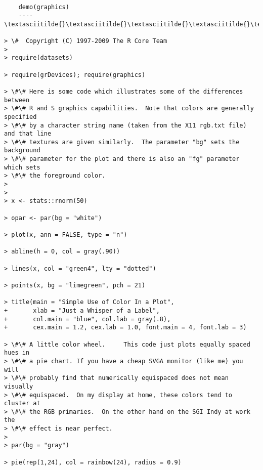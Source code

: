\documentclass[11pt]{article}
\begin{document}
    \begin{Verbatim}[commandchars=\\\{\}]


	demo(graphics)
	---- \textasciitilde{}\textasciitilde{}\textasciitilde{}\textasciitilde{}\textasciitilde{}\textasciitilde{}\textasciitilde{}\textasciitilde{}

> \#  Copyright (C) 1997-2009 The R Core Team
> 
> require(datasets)

> require(grDevices); require(graphics)

> \#\# Here is some code which illustrates some of the differences between
> \#\# R and S graphics capabilities.  Note that colors are generally specified
> \#\# by a character string name (taken from the X11 rgb.txt file) and that line
> \#\# textures are given similarly.  The parameter "bg" sets the background
> \#\# parameter for the plot and there is also an "fg" parameter which sets
> \#\# the foreground color.
> 
> 
> x <- stats::rnorm(50)

> opar <- par(bg = "white")

> plot(x, ann = FALSE, type = "n")

> abline(h = 0, col = gray(.90))

> lines(x, col = "green4", lty = "dotted")

> points(x, bg = "limegreen", pch = 21)

> title(main = "Simple Use of Color In a Plot",
+       xlab = "Just a Whisper of a Label",
+       col.main = "blue", col.lab = gray(.8),
+       cex.main = 1.2, cex.lab = 1.0, font.main = 4, font.lab = 3)

> \#\# A little color wheel.	 This code just plots equally spaced hues in
> \#\# a pie chart.	If you have a cheap SVGA monitor (like me) you will
> \#\# probably find that numerically equispaced does not mean visually
> \#\# equispaced.  On my display at home, these colors tend to cluster at
> \#\# the RGB primaries.  On the other hand on the SGI Indy at work the
> \#\# effect is near perfect.
> 
> par(bg = "gray")

> pie(rep(1,24), col = rainbow(24), radius = 0.9)

    \end{Verbatim}

    \begin{center}
    \end{center}
    { \hspace*{\fill} \\}
    
\end{document}
